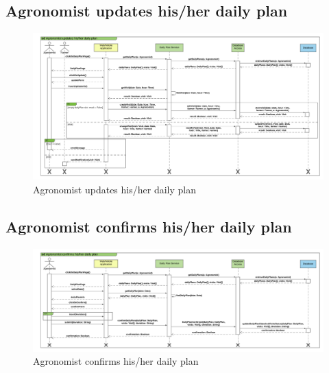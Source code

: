 \subsection{Agronomist updates his/her daily plan}

\newpage
\begin{landscape}
\begin{figure}[h]
\vspace*{-2cm}
\noindent
\centering
\centerline{\includegraphics[scale= 0.108]{./Images/Sequence diagram/Agronomist updates his_her daily plan.png}}
    \caption{Agronomist updates his/her daily plan}
    \vspace*{-12cm}
\end{figure}
\fillandplacepagenumber
\end{landscape}


\subsection{Agronomist confirms his/her daily plan}

\newpage
\begin{landscape}
\begin{figure}[h]
\vspace*{-2cm}
\noindent
\centering
\centerline{\includegraphics[scale= 0.108]{./Images/Sequence diagram/Agronomist confirms his_her daily plan.png}}
    \caption{Agronomist confirms his/her daily plan}
    \vspace*{-12cm}
\end{figure}
\fillandplacepagenumber
\end{landscape}


